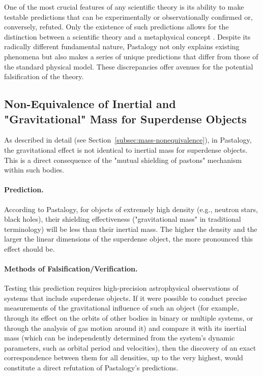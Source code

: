 \documentclass[pdflatex,sn-mathphys-num,referee]{sn-jnl}
\begin{document}
One of the most crucial features of any scientific theory is its ability to make testable predictions that can be experimentally or observationally confirmed or, conversely, refuted. Only the existence of such predictions allows for the distinction between a scientific theory and a metaphysical concept \cite{popper1959}. Despite its radically different fundamental nature, Pastalogy not only explains existing phenomena but also makes a series of unique predictions that differ from those of the standard physical model. These discrepancies offer avenues for the potential falsification of the theory.

\subsection{Non-Equivalence of Inertial and "Gravitational" Mass for Superdense Objects}\label{subsec:mass-inequivalence}

As described in detail (see Section~\ref{subsec:mass-nonequivalence}), in Pastalogy, the gravitational effect is not identical to inertial mass for superdense objects. This is a direct consequence of the "mutual shielding of pastons" mechanism within such bodies.

\paragraph{Prediction.} According to Pastalogy, for objects of extremely high density (e.g., neutron stars, black holes), their shielding effectiveness ("gravitational mass" in traditional terminology) will be less than their inertial mass. The higher the density and the larger the linear dimensions of the superdense object, the more pronounced this effect should be.

\paragraph{Methods of Falsification/Verification.} Testing this prediction requires high-precision astrophysical observations of systems that include superdense objects. If it were possible to conduct precise measurements of the gravitational influence of such an object (for example, through its effect on the orbits of other bodies in binary or multiple systems, or through the analysis of gas motion around it) and compare it with its inertial mass (which can be independently determined from the system's dynamic parameters, such as orbital period and velocities), then the discovery of an exact correspondence between them for all densities, up to the very highest, would constitute a direct refutation of Pastalogy's predictions.
\end{document}
